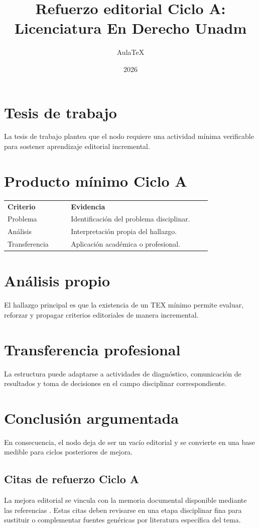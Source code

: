 \documentclass[12pt]{article}
\title{Refuerzo editorial Ciclo A: Licenciatura En Derecho Unadm}
\author{AulaTeX}
\date{2026}
\begin{document}
\maketitle
\section*{Tesis de trabajo}
La tesis de trabajo plantea que el nodo requiere una actividad mínima verificable para sostener aprendizaje editorial incremental.
\section*{Producto mínimo Ciclo A}
\begin{center}
\begin{tabular}{p{0.28\linewidth}p{0.62\linewidth}}
\textbf{Criterio} & \textbf{Evidencia}\\
Problema & Identificación del problema disciplinar.\\
Análisis & Interpretación propia del hallazgo.\\
Transferencia & Aplicación académica o profesional.\\
\end{tabular}
\end{center}
\section*{Análisis propio}
El hallazgo principal es que la existencia de un TEX mínimo permite evaluar, reforzar y propagar criterios editoriales de manera incremental.
\section*{Transferencia profesional}
La estructura puede adaptarse a actividades de diagnóstico, comunicación de resultados y toma de decisiones en el campo disciplinar correspondiente.
\section*{Conclusión argumentada}
En consecuencia, el nodo deja de ser un vacío editorial y se convierte en una base medible para ciclos posteriores de mejora.



\subsection*{Citas de refuerzo Ciclo A}
La mejora editorial se vincula con la memoria documental disponible mediante las referencias \citep{cicloARefuerzo01,cicloARefuerzo02,cicloARefuerzo03,cicloARefuerzo04,cicloARefuerzo05,cicloARefuerzo06}. Estas citas deben revisarse en una etapa disciplinar fina para sustituir o complementar fuentes genéricas por literatura específica del tema.
\end{document}
